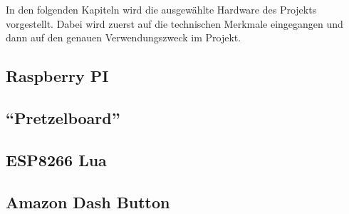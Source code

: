 In den folgenden Kapiteln wird die ausgewählte Hardware des Projekts vorgestellt. Dabei wird zuerst auf die technischen Merkmale eingegangen und dann auf den genauen Verwendungszweck im Projekt. 

\subsection{Raspberry PI}        
\label{sec:Raspberry PI-1} 


\newpage

\subsection{``Pretzelboard''}        
\label{sec:Pretzelboard-1} 

\newpage

\subsection{ESP8266 Lua}
\label{sec:ESP8266}



\subsection{Amazon Dash Button}
\label{sec:Amazon Dash Button}


\newpage